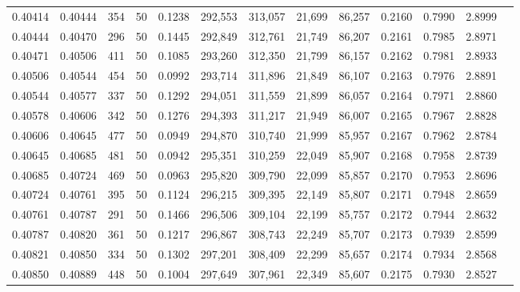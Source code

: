 \begin{tabular}{rrrrrrrrrrrrr}
0.40414 & 0.40444 &   354 &  50 &                                     0.1238 & 292,553 & 313,057 &  21,699 &  86,257 & 0.2160 & 0.7990 & 2.8999 \\
0.40444 & 0.40470 &   296 &  50 &                                     0.1445 & 292,849 & 312,761 &  21,749 &  86,207 & 0.2161 & 0.7985 & 2.8971 \\
0.40471 & 0.40506 &   411 &  50 &                                     0.1085 & 293,260 & 312,350 &  21,799 &  86,157 & 0.2162 & 0.7981 & 2.8933 \\
0.40506 & 0.40544 &   454 &  50 &                                     0.0992 & 293,714 & 311,896 &  21,849 &  86,107 & 0.2163 & 0.7976 & 2.8891 \\
0.40544 & 0.40577 &   337 &  50 &                                     0.1292 & 294,051 & 311,559 &  21,899 &  86,057 & 0.2164 & 0.7971 & 2.8860 \\
0.40578 & 0.40606 &   342 &  50 &                                     0.1276 & 294,393 & 311,217 &  21,949 &  86,007 & 0.2165 & 0.7967 & 2.8828 \\
0.40606 & 0.40645 &   477 &  50 &                                     0.0949 & 294,870 & 310,740 &  21,999 &  85,957 & 0.2167 & 0.7962 & 2.8784 \\
0.40645 & 0.40685 &   481 &  50 &                                     0.0942 & 295,351 & 310,259 &  22,049 &  85,907 & 0.2168 & 0.7958 & 2.8739 \\
0.40685 & 0.40724 &   469 &  50 &                                     0.0963 & 295,820 & 309,790 &  22,099 &  85,857 & 0.2170 & 0.7953 & 2.8696 \\
0.40724 & 0.40761 &   395 &  50 &                                     0.1124 & 296,215 & 309,395 &  22,149 &  85,807 & 0.2171 & 0.7948 & 2.8659 \\
0.40761 & 0.40787 &   291 &  50 &                                     0.1466 & 296,506 & 309,104 &  22,199 &  85,757 & 0.2172 & 0.7944 & 2.8632 \\
0.40787 & 0.40820 &   361 &  50 &                                     0.1217 & 296,867 & 308,743 &  22,249 &  85,707 & 0.2173 & 0.7939 & 2.8599 \\
0.40821 & 0.40850 &   334 &  50 &                                     0.1302 & 297,201 & 308,409 &  22,299 &  85,657 & 0.2174 & 0.7934 & 2.8568 \\
0.40850 & 0.40889 &   448 &  50 &                                     0.1004 & 297,649 & 307,961 &  22,349 &  85,607 & 0.2175 & 0.7930 & 2.8527 \\

\end{tabular}
